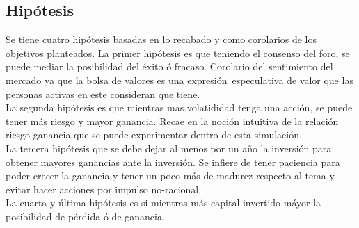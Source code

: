 \documentclass[letterpaper, 12pt]{article}
\begin{document}
\begin{justify}
        \section*{Hipótesis}
        \justify
        Se tiene cuatro hipótesis basadas en lo recabado y como corolarios de los objetivos planteados. La primer hipótesis es que teniendo el consenso del foro, se puede mediar la posibilidad del éxito ó fracaso. Corolario del sentimiento del mercado ya que la bolsa de valores es una expresión\
        especulativa de valor que las personas activas en este consideran que tiene.
        \\\newline
        La segunda hipótesis es que mientras mas volatididad tenga una acción, se puede tener más riesgo y mayor ganancia. Recae en la noción intuitiva de la relación riesgo-ganancia que se puede experimentar dentro de esta simulación.
        \\\newline
        La tercera hipótesis que se debe dejar al menos por un año la inversión para obtener mayores ganancias ante la inversión. Se infiere de tener paciencia para poder crecer la ganancia y tener un poco más de madurez respecto al tema y evitar hacer acciones por impulso no-racional.
        \\\newline
        La cuarta y última hipótesis es si mientras más capital invertido máyor la posibilidad de pérdida ó de ganancia.
    \end{justify}
\end{document}
